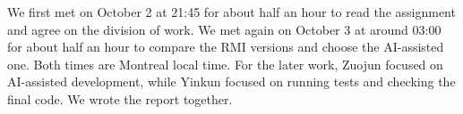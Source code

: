 \documentclass[11pt,letterpaper]{article}
\begin{document}
We first met on October 2 at 21:45 for about half an hour to read the assignment and
agree on the division of work. We met again on October 3 at around 03:00 for about
half an hour to compare the RMI versions and choose the AI-assisted one. Both times
are Montreal local time. For the later work, Zuojun focused on AI-assisted development,
while Yinkun focused on running tests and checking the final code. We wrote the report
together.
\end{document}
